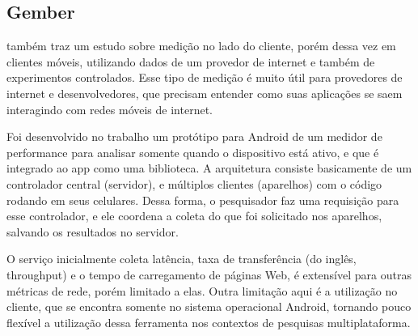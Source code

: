 \documentclass[12pt]{tcc}
\begin{document}
		\subsection{Gember}
		\par \citet{Gember2012Obtaining} também traz um estudo sobre medição no lado do cliente, porém dessa vez em clientes móveis, utilizando dados de um provedor de internet e também de experimentos controlados. Esse tipo de medição é muito útil para provedores de internet e desenvolvedores, que precisam entender como suas aplicações se saem interagindo com redes móveis de internet.
		\par Foi desenvolvido no trabalho um protótipo para Android de um medidor de performance para analisar somente quando o dispositivo está ativo, e que é integrado ao app como uma biblioteca. A arquitetura consiste basicamente de um controlador central (servidor), e múltiplos clientes (aparelhos) com o código rodando em seus celulares. Dessa forma, o pesquisador faz uma requisição para esse controlador, e ele coordena a coleta do que foi solicitado nos aparelhos, salvando os resultados no servidor.
		\par O serviço inicialmente coleta latência, taxa de transferência (do inglês, {throughput}) e o tempo de carregamento de páginas Web, é extensível para outras métricas de rede, porém limitado a elas. Outra limitação aqui é a utilização no cliente, que se encontra somente no sistema operacional Android, tornando pouco flexível a utilização dessa ferramenta nos contextos de pesquisas multiplataforma.
\end{document}
